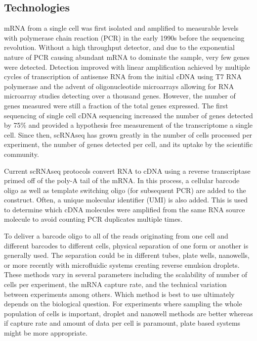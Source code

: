\subsection{Technologies}

\par{
mRNA from a single cell was first isolated and amplified to measurable levels with polymerase chain reaction (PCR)\cite{PCR}\cite{PCRPatent} in the early 1990s\cite{earliersinglecell} before the sequencing revolution. Without a high throughput detector, and due to the exponential nature of PCR causing abundant mRNA to dominate the sample, very few genes were detected. Detection improved with linear amplification achieved by multiple cycles of transcription of antisense RNA from the initial cDNA using T7 RNA polymerase\cite{T7amp} and the advent of oligonucleotide microarrays\cite{snpchip} allowing for RNA microarray studies detecting over a thousand genes\cite{microarrayRNA}\cite{microarraySC2}. However, the number of genes measured were still a fraction of the total genes expressed. The first sequencing of single cell cDNA sequencing increased the number of genes detected by 75\%\cite{first_singlecell} and provided a hypothesis free measurement of the transcriptome a single cell. Since then, scRNAseq has grown greatly in the number of cells processed per experiment, the number of genes detected per cell, and its uptake by the scientific community\cite{singlecellgrowth}.
}

\par{
Current scRNAseq protocols convert RNA to cDNA using a reverse transcriptase primed off of the poly-A tail of the mRNA. In this process, a cellular barcode oligo as well as template switching oligo (for subsequent PCR) are added to the construct. Often, a unique molecular identifier (UMI) is also added. This is used to determine which cDNA molecules were amplified from the same RNA source molecule to avoid counting PCR duplicates multiple times\cite{UMI1}\cite{UMI2}.
} 

\par{
To deliver a barcode oligo to all of the reads originating from one cell and different barcodes to different cells, physical separation of one form or another is generally used. The separation could be in different tubes, plate wells, nanowells\cite{seqwell}\cite{scalablemicro}\cite{combilabel}, or more recently with microfluidic systems creating reverse emulsion droplets\cite{dropseq}\cite{Klein2015}\cite{10xsinglecell}. These methods vary in several parameters including the scalability of number of cells per experiment, the mRNA capture rate, and the technical variation between experiments among others\cite{powersingle}\cite{singlecompare}\cite{singlecompare2}. Which method is best to use ultimately depends on the biological question. For experiments where sampling the whole population of cells is important, droplet and nanowell methods are better whereas if capture rate and amount of data per cell is paramount, plate based systems might be more appropriate. 
}

